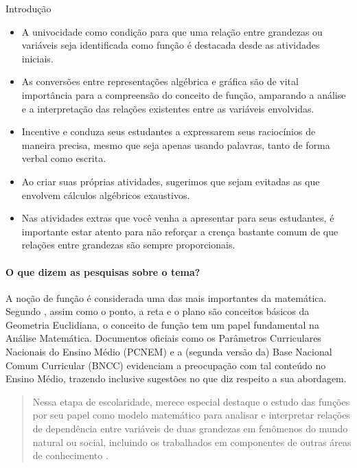 \begin{apresentacao}{Introdução}
\begin{itemize}
\item {} 
A univocidade como condição para que uma relação entre grandezas ou variáveis seja identificada como função é destacada desde as atividades iniciais.

\item {} 
As conversões entre representações algébrica e gráfica são de vital importância para a compreensão do conceito de função, amparando a análise e a interpretação das relações existentes entre as variáveis envolvidas.

\item {} 
Incentive e conduza seus estudantes a expressarem seus raciocínios de maneira precisa, mesmo que seja apenas usando palavras, tanto de forma verbal como escrita.

\item {} 
Ao criar suas próprias atividades, sugerimos que sejam evitadas as que envolvem cálculos algébricos exaustivos.

\item {} 
Nas atividades extras que você venha a apresentar para seus estudantes, é importante estar atento para não reforçar a crença bastante comum de que relações entre grandezas são sempre proporcionais.

\end{itemize}

\paragraph{O que dizem as pesquisas sobre o tema?}

A noção de função é considerada uma das mais importantes da matemática. Segundo \cite{Ponte1992}, assim como o ponto, a reta e o plano são conceitos básicos da Geometria Euclidiana, o  conceito de função tem um papel fundamental na Análise Matemática. Documentos oficiais como os Parâmetros Curriculares Nacionais do Ensino Médio (PCNEM) e a (segunda versão da) Base Nacional Comum Curricular (BNCC)  evidenciam a preocupação com tal conteúdo no Ensino Médio, trazendo inclusive sugestões no que diz respeito a sua abordagem.
\begin{quote}

Nessa etapa de escolaridade, merece especial destaque o estudo das funções por seu papel como modelo matemático para analisar e interpretar relações de dependência entre variáveis de duas grandezas em fenômenos do mundo natural ou social, incluindo os trabalhados em componentes de outras áreas de conhecimento \citep[p.576]{BNCC2016}.


\end{quote}
\end{apresentacao}

